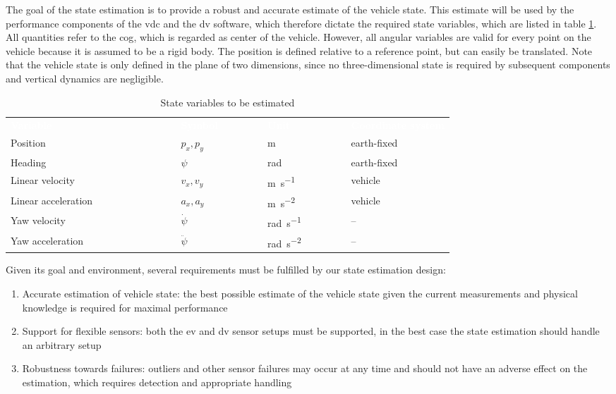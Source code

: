 The goal of the state estimation is to provide a robust and accurate estimate of the vehicle state. This estimate will be used by the performance components of the \gls{vdc} and the \gls{dv} software, which therefore dictate the required state variables, which are listed in table \ref{tab:state-variables}. All quantities refer to the \gls{cog}, which is regarded as center of the vehicle. However, all angular variables are valid for every point on the vehicle because it is assumed to be a rigid body. The position is defined relative to a reference point, but can easily be translated. Note that the vehicle state is only defined in the plane of two dimensions, since no three-dimensional state is required by subsequent components and vertical dynamics are negligible.

\begin{table}
	\newcommand\heading[1]{\textcolor{white}{\textbf{#1}}}
	\renewcommand{\arraystretch}{1.2}
	\sffamily
	\centering
	\begin{tabularx}{\textwidth}{l l l X}
	\rowcolor{black} \heading{Variable~~~~~~~~~~~~~~~~~~~~~} & \heading{Symbol~~~~~~~} & \heading{Unit~~~~~~~~~} & \heading{Coordinate system} \vspace{2pt} \\
	Position & $p_x, p_y$ & \si{\meter} & earth-fixed \\
	Heading & $\psi$ & \si{\radian} & earth-fixed \\
	Linear velocity & $v_x, v_y$ & \si{\meter\per\second} & vehicle \\
	Linear acceleration & $a_x, a_y$ & \si{\meter\per\square\second} & vehicle \\
	Yaw velocity & $\dot{\psi}$ & \si{\radian\per\second} & -- \\
	Yaw acceleration & $\ddot{\psi}$ & \si{\radian\per\square\second} & -- \\
	\end{tabularx}
	\caption{State variables to be estimated}
	\label{tab:state-variables}
\end{table}

Given its goal and environment, several requirements must be fulfilled by our state estimation design:
\begin{enumerate}
\item Accurate estimation of vehicle state: the best possible estimate of the vehicle state given the current measurements and physical knowledge is required for maximal performance
\item Support for flexible sensors: both the \gls{ev} and \gls{dv} sensor setups must be supported, in the best case the state estimation should handle an arbitrary setup
\item Robustness towards failures: outliers and other sensor failures may occur at any time and should not have an adverse effect on the estimation, which requires detection and appropriate handling
\end{enumerate}

